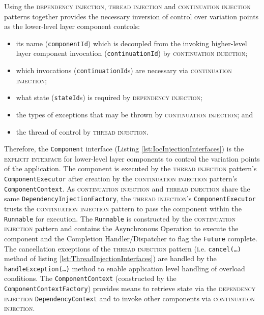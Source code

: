 \documentclass[prodmode]{style/acmlarge}
\begin{document}
Using the \textsc{dependency injection}, \textsc{thread injection} and
\textsc{continuation injection} patterns together provides the necessary inversion
of control over variation points as the lower-level layer component controls:
\begin{itemize}
  \item its name (\texttt{componentId}) which is decoupled from the invoking higher-level layer component invocation (\texttt{contin\-uationId}) by \textsc{continuation injection};
  \item which invocations (\texttt{continuationId}s) are necessary via \textsc{continuation injection};
  \item what state (\texttt{stateId}s) is required by \textsc{dependency injection};
  \item the types of exceptions that may be thrown by \textsc{continuation injection}; and
  \item the thread of control by \textsc{thread injection}.
\end{itemize}

Therefore, the \texttt{Component} interface (Listing
\ref{lst:IocInjectionInterfaces}) is the \textsc{explicit interface} for
lower-level layer components to control the variation points of the application.
 The component is executed by the \textsc{thread injection} pattern's
\texttt{ComponentExecutor} after creation by the \textsc{continuation injection}
pattern's \texttt{ComponentContext}.  As \textsc{continuation injection} and
\textsc{thread injection} share the same \texttt{DependencyInjectionFactory},
the \textsc{thread injection}'s \texttt{ComponentExecutor} trusts the
\textsc{continuation injection} pattern to pass the component within the
\texttt{Runnable} for execution.  The \texttt{Runnable} is constructed by the
\textsc{continuation injection} pattern and contains the Asynchronous Operation
to execute the component and the Completion Handler/Dispatcher to flag the
\texttt{Future} complete.  The cancellation exceptions of the \textsc{thread
injection} pattern (i.e. \texttt{cancel(\ldots)} method of listing
\ref{lst:ThreadInjectionInterfaces}) are handled by the
\texttt{handleException(\ldots)} method to enable application level handling of
overload conditions.  The \texttt{ComponentContext} (constructed by the
\texttt{ComponentContextFactory}) provides means to retrieve state via the
\textsc{dependency injection} \texttt{Dependency\-Context} and to invoke other
components via \textsc{continuation injection}.
\end{document}

